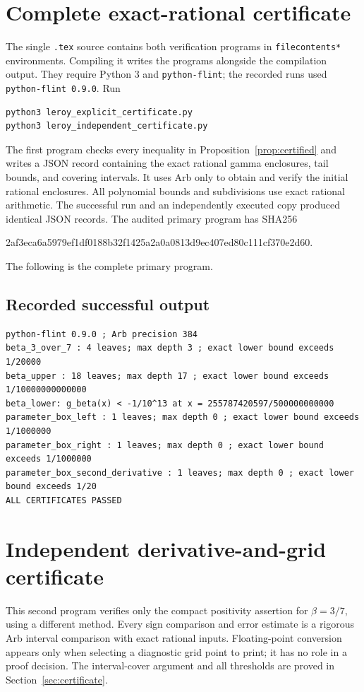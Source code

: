 \documentclass[11pt,a4paper]{article}
\numberwithin{equation}{section}
\theoremstyle{definition}\newtheorem{definition}[theorem]{Definition}
\theoremstyle{remark}\newtheorem{remark}[theorem]{Remark}
\begin{document}
\clearpage
\appendix
\section{Complete exact-rational certificate}
\label{app:code}

The single \texttt{.tex} source contains both verification programs
in \texttt{filecontents*} environments. Compiling it writes the
programs alongside the compilation output. They require Python 3
and \texttt{python-flint}; the recorded runs used
\texttt{python-flint 0.9.0}. Run
\begin{lstlisting}[language={}]
python3 leroy_explicit_certificate.py
python3 leroy_independent_certificate.py
\end{lstlisting}
The first program checks every inequality in
Proposition~\ref{prop:certified} and writes a JSON record containing
the exact rational gamma enclosures, tail bounds, and covering
intervals. It uses Arb only to obtain and verify the initial rational
enclosures. All polynomial bounds and subdivisions use exact rational
arithmetic. The successful run and an independently executed copy
produced identical JSON records. The audited primary program has
SHA256
\begin{center}\ttfamily\footnotesize
2af3eca6a5979ef1df0188b32f1425a2a0a0813d9ec407ed80c111cf370e2d60.
\end{center}
The following is the complete primary program.



\subsection*{Recorded successful output}
\begin{lstlisting}[language={}]
python-flint 0.9.0 ; Arb precision 384
beta_3_over_7 : 4 leaves; max depth 3 ; exact lower bound exceeds 1/20000
beta_upper : 18 leaves; max depth 17 ; exact lower bound exceeds 1/10000000000000
beta_lower: g_beta(x) < -1/10^13 at x = 255787420597/500000000000
parameter_box_left : 1 leaves; max depth 0 ; exact lower bound exceeds 1/1000000
parameter_box_right : 1 leaves; max depth 0 ; exact lower bound exceeds 1/1000000
parameter_box_second_derivative : 1 leaves; max depth 0 ; exact lower bound exceeds 1/20
ALL CERTIFICATES PASSED
\end{lstlisting}

\clearpage
\section{Independent derivative-and-grid certificate}
\label{app:independent}

This second program verifies only the compact positivity assertion
for \(\beta=3/7\), using a different method. Every sign comparison
and error estimate is a rigorous Arb interval comparison with exact
rational inputs. Floating-point conversion appears only when
selecting a diagnostic grid point to print; it has no role in a proof
decision. The interval-cover argument and all thresholds are proved
in Section~\ref{sec:certificate}.


\end{document}
